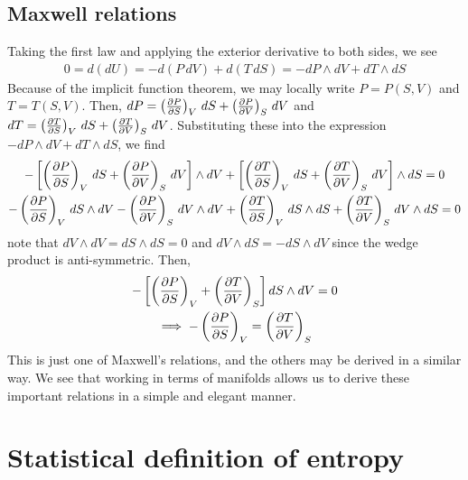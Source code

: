 \documentclass[12pt]{article}
\begin{document}
\subsection{Maxwell relations}
Taking the first law and applying the exterior derivative to both sides, we see
\begin{gather}
    0 = d(dU) = -d(P\, dV) + d(T\, dS) = -dP \wedge dV + dT \wedge dS
\end{gather}
Because of the implicit function theorem, we may locally write $P = P(S, V)$ and $T = T(S, V)$. Then, $dP = \left(\frac{\partial P}{\partial S}\right)_{V}\, dS + \left(\frac{\partial P}{\partial V}\right)_{S}\, dV$ and $dT = \left(\frac{\partial T}{\partial S}\right)_{V}\, dS + \left(\frac{\partial T}{\partial V}\right)_{S}\, dV$. Substituting these into the expression $-dP \wedge dV + dT \wedge dS$, we find
\begin{gather}
    -\left[\left(\frac{\partial P}{\partial S}\right)_{V}\, dS + \left(\frac{\partial P}{\partial V}\right)_{S}\, dV\right]\wedge dV + \left[\left(\frac{\partial T}{\partial S}\right)_{V}\, dS + \left(\frac{\partial T}{\partial V}\right)_{S}\, dV\right] \wedge dS = 0\\
    -\left(\frac{\partial P}{\partial S}\right)_{V}\, dS\wedge dV - \left(\frac{\partial P}{\partial V}\right)_{S}\, dV\wedge dV + \left(\frac{\partial T}{\partial S}\right)_{V}\, dS\wedge dS + \left(\frac{\partial T}{\partial V}\right)_{S}\, dV \wedge dS = 0
\end{gather}
note that $dV \wedge dV = dS \wedge dS = 0$ and $dV \wedge dS = - dS \wedge dV$ since the wedge product is anti-symmetric. Then,
\begin{gather}
    -\left[\left(\frac{\partial P}{\partial S}\right)_{V} + \left(\frac{\partial T}{\partial V}\right)_{S}\right] dS \wedge dV = 0\\
    \implies -\left(\frac{\partial P}{\partial S}\right)_{V} = \left(\frac{\partial T}{\partial V}\right)_{S}
\end{gather}
This is just one of Maxwell's relations, and the others may be derived in a similar way. We see that working in terms of manifolds allows us to derive these important relations in a simple and elegant manner.

\section{Statistical definition of entropy}


\pagebreak
\end{document}
